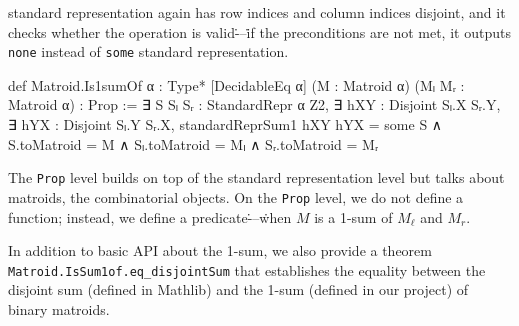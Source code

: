 standard representation again has row indices and column indices disjoint,
and it checks whether the operation is valid\.---\.if the preconditions
are not met, it outputs \texttt{none} instead of \texttt{some} standard representation.
\begin{leancode}
def Matroid.Is1sumOf {α : Type*} [DecidableEq α]
    (M : Matroid α) (Mₗ Mᵣ : Matroid α) :
    Prop :=
  ∃ S Sₗ Sᵣ : StandardRepr α Z2,
  ∃ hXY : Disjoint Sₗ.X Sᵣ.Y,
  ∃ hYX : Disjoint Sₗ.Y Sᵣ.X,
  standardReprSum1 hXY hYX = some S
  ∧ S.toMatroid = M
  ∧ Sₗ.toMatroid = Mₗ
  ∧ Sᵣ.toMatroid = Mᵣ
\end{leancode}
The \texttt{Prop} level builds on top of the standard representation level but
talks about matroids, the combinatorial objects. On the \texttt{Prop} level, we
do not define a function; instead, we define a predicate\.---\.when $M$ is
a 1-sum of $M_{\ell}$ and $M_{r}$.

In addition to basic API about the 1-sum, we also provide
a theorem \texttt{Matroid.IsSum1of.eq\_disjointSum} that establishes
the equality between the disjoint sum (defined in Mathlib) and
the 1-sum (defined in our project) of binary matroids.

\begin{comment}
    Ivan's suggestions:
    \begin{itemize}
        \item introduction can be shortened without losing clarity, e.g., "we implement the sums of matroids in three steps"
        \item discuss design decisions: why did we implement things this way? talk about our motivation
        \item focus on results rather than process, e.g., "Proving this lemma was surprisingly difficult" $\to$ "The proof of this lemma is surprisingly long" (+ why surprisingly? what is making it long?), "could have been avoided" $\to$ "this follows from a similar result for 2-sums" (what is the message of this paragraph? should it be included?)
        \item mention why result for 1-sums was kept even though it follows from similar result for 2-sums
    \end{itemize}
\end{comment}
